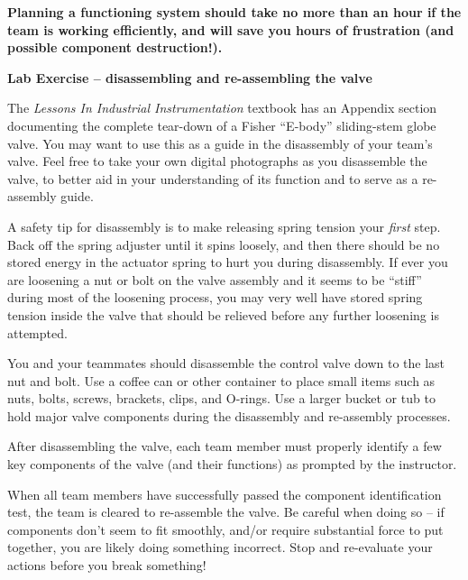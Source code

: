 \begin{itemize}
\vskip 10pt

{\bf Planning a functioning system should take no more than an hour if the team is working efficiently, and will save you hours of frustration (and possible component destruction!).}





\vfil \eject

\noindent
{\bf Lab Exercise -- disassembling and re-assembling the valve}

\vskip 5pt

The {\it Lessons In Industrial Instrumentation} textbook has an Appendix section documenting the complete tear-down of a Fisher ``E-body'' sliding-stem globe valve.  You may want to use this as a guide in the disassembly of your team's valve.  Feel free to take your own digital photographs as you disassemble the valve, to better aid in your understanding of its function and to serve as a re-assembly guide.

A safety tip for disassembly is to make releasing spring tension your {\it first} step.  Back off the spring adjuster until it spins loosely, and then there should be no stored energy in the actuator spring to hurt you during disassembly.  If ever you are loosening a nut or bolt on the valve assembly and it seems to be ``stiff'' during most of the loosening process, you may very well have stored spring tension inside the valve that should be relieved before any further loosening is attempted.

You and your teammates should disassemble the control valve down to the last nut and bolt.  Use a coffee can or other container to place small items such as nuts, bolts, screws, brackets, clips, and O-rings.  Use a larger bucket or tub to hold major valve components during the disassembly and re-assembly processes.

\vskip 10pt

After disassembling the valve, each team member must properly identify a few key components of the valve (and their functions) as prompted by the instructor.

\vskip 10pt

When all team members have successfully passed the component identification test, the team is cleared to re-assemble the valve.  Be careful when doing so -- if components don't seem to fit smoothly, and/or require substantial force to put together, you are likely doing something incorrect.  Stop and re-evaluate your actions before you break something!


\end{itemize}
